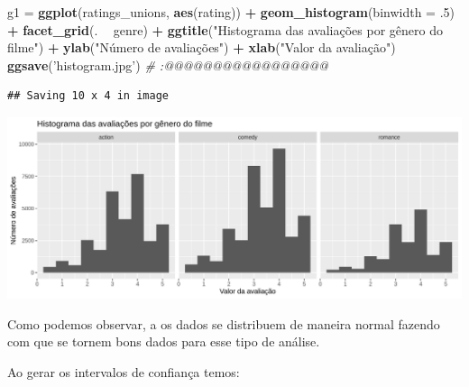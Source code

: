 \documentclass[]{article}
\newenvironment{Shaded}{\begin{snugshade}}{\end{snugshade}}
\newcommand{\CommentTok}[1]{\textcolor[rgb]{0.56,0.35,0.01}{\textit{#1}}}
\newcommand{\DataTypeTok}[1]{\textcolor[rgb]{0.13,0.29,0.53}{#1}}
\newcommand{\FloatTok}[1]{\textcolor[rgb]{0.00,0.00,0.81}{#1}}
\newcommand{\KeywordTok}[1]{\textcolor[rgb]{0.13,0.29,0.53}{\textbf{#1}}}
\newcommand{\NormalTok}[1]{#1}
\newcommand{\OperatorTok}[1]{\textcolor[rgb]{0.81,0.36,0.00}{\textbf{#1}}}
\newcommand{\StringTok}[1]{\textcolor[rgb]{0.31,0.60,0.02}{#1}}
\begin{document}
\begin{Shaded}
\begin{Highlighting}[]
\NormalTok{  g1 =}\StringTok{ }\KeywordTok{ggplot}\NormalTok{(ratings_unions, }\KeywordTok{aes}\NormalTok{(rating)) }\OperatorTok{+}
\StringTok{    }\KeywordTok{geom_histogram}\NormalTok{(}\DataTypeTok{binwidth =} \FloatTok{.5}\NormalTok{) }\OperatorTok{+}\StringTok{ }
\StringTok{    }\KeywordTok{facet_grid}\NormalTok{(. }\OperatorTok{~}\StringTok{ }\NormalTok{genre) }\OperatorTok{+}\StringTok{ }
\StringTok{    }\KeywordTok{ggtitle}\NormalTok{(}\StringTok{"Histograma das avaliações por gênero do filme"}\NormalTok{) }\OperatorTok{+}\StringTok{ }
\StringTok{    }\KeywordTok{ylab}\NormalTok{(}\StringTok{"Número de avaliações"}\NormalTok{) }\OperatorTok{+}\StringTok{ }
\StringTok{    }\KeywordTok{xlab}\NormalTok{(}\StringTok{"Valor da avaliação"}\NormalTok{)}
  \KeywordTok{ggsave}\NormalTok{(}\StringTok{'histogram.jpg'}\NormalTok{) }\CommentTok{# :@@@@@@@@@@@@@@@@@}
\end{Highlighting}
\end{Shaded}

\begin{verbatim}
## Saving 10 x 4 in image
\end{verbatim}

\includegraphics{./histogram.jpg}

Como podemos observar, a os dados se distribuem de maneira normal
fazendo com que se tornem bons dados para esse tipo de análise.

Ao gerar os intervalos de confiança temos:
\end{document}
